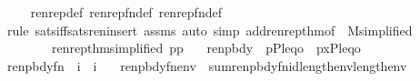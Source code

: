 \begin{isabellebody}
%
\isadelimproof
\ \ %
\endisadelimproof
%
\isatagproof
{}\isamarkupfalse%
\ \ renrep{\isacharunderscore}{\kern0pt}def\ renrep{\isacharunderscore}{\kern0pt}fn{\isacharunderscore}{\kern0pt}def\ renrep{}{\isacharunderscore}{\kern0pt}fn{\isacharunderscore}{\kern0pt}def\isanewline
\ \ \isamarkupfalse%
\ {\isacharparenleft}{\kern0pt}rule\ sats{\isacharunderscore}{\kern0pt}iff{\isacharunderscore}{\kern0pt}sats{\isacharunderscore}{\kern0pt}ren{\isacharcomma}{\kern0pt}insert\ assms{\isacharcomma}{\kern0pt}\ auto\ simp\ add{\isacharcolon}{\kern0pt}renrep{}{\isacharunderscore}{\kern0pt}thm{\isacharparenleft}{\kern0pt}{}{\isacharparenright}{\kern0pt}{\isacharbrackleft}{\kern0pt}of\ {\isacharunderscore}{\kern0pt}\ M{\isacharcomma}{\kern0pt}simplified{\isacharbrackright}{\kern0pt}\isanewline
\ \ \ \ \ \ \ \ renrep{}{\isacharunderscore}{\kern0pt}thm{\isacharparenleft}{\kern0pt}{}{\isacharparenright}{\kern0pt}{\isacharbrackleft}{\kern0pt}simplified{\isacharcomma}{\kern0pt}\ p{\isacharequal}{\kern0pt}p\ \ {\isasymalpha}{\isacharequal}{\kern0pt}{\isasymalpha}{\isacharbrackright}{\kern0pt}{\isacharparenright}{\kern0pt}%
\endisatagproof
{\isafoldproof}%
%
\isadelimproof
\isanewline
%
\endisadelimproof
%
\isadelimML
\isanewline
%
\endisadelimML
%
\isatagML
{}\isamarkupfalse%
\ {\isachardoublequoteopen}renpbdy{}{\isachardoublequoteclose}\ \ {\isachardoublequoteopen}{\isacharbrackleft}{\kern0pt}{\isasymrho}{\isacharcomma}{\kern0pt}p{\isacharcomma}{\kern0pt}{\isasymalpha}{\isacharcomma}{\kern0pt}P{\isacharcomma}{\kern0pt}leq{\isacharcomma}{\kern0pt}o{\isacharbrackright}{\kern0pt}{\isachardoublequoteclose}\ \ {\isachardoublequoteopen}{\isacharbrackleft}{\kern0pt}{\isasymrho}{\isacharcomma}{\kern0pt}p{\isacharcomma}{\kern0pt}x{\isacharcomma}{\kern0pt}{\isasymalpha}{\isacharcomma}{\kern0pt}P{\isacharcomma}{\kern0pt}leq{\isacharcomma}{\kern0pt}o{\isacharbrackright}{\kern0pt}{\isachardoublequoteclose}%
\endisatagML
{\isafoldML}%
%
\isadelimML
\isanewline
%
\endisadelimML
\isanewline
{}\isamarkupfalse%
\ renpbdy{\isacharunderscore}{\kern0pt}fn\ {\isacharcolon}{\kern0pt}{\isacharcolon}{\kern0pt}\ {\isachardoublequoteopen}i\ {\isasymRightarrow}\ i{\isachardoublequoteclose}\ \isanewline
\ \ {\isachardoublequoteopen}renpbdy{\isacharunderscore}{\kern0pt}fn{\isacharparenleft}{\kern0pt}env{\isacharparenright}{\kern0pt}\ {\isasymequiv}\ sum{\isacharparenleft}{\kern0pt}renpbdy{}{\isacharunderscore}{\kern0pt}fn{\isacharcomma}{\kern0pt}id{\isacharparenleft}{\kern0pt}length{\isacharparenleft}{\kern0pt}env{\isacharparenright}{\kern0pt}{\isacharparenright}{\kern0pt}{\isacharcomma}{\kern0pt}{}{\isacharcomma}{\kern0pt}{}{\isacharcomma}{\kern0pt}length{\isacharparenleft}{\kern0pt}env{\isacharparenright}{\kern0pt}{\isacharparenright}{\kern0pt}{\isachardoublequoteclose}\isanewline

\end{isabellebody}
